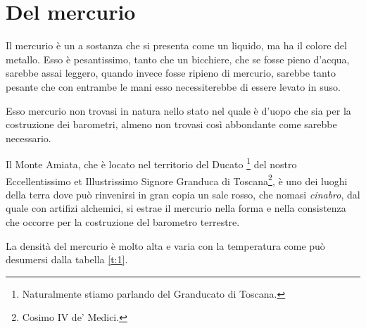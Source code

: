 \documentclass[%
corpo=12pt,
twoside,
tipotesi=magistrale,
]{toptesi}\errorcontextlines=100
\begin{document}
\section{Del mercurio}
Il mercurio è un a sostanza che si presenta come un liquido, ma ha il colore
del metallo. Esso è pesantissimo, tanto che un bicchiere, che se fosse pieno
d'acqua, sarebbe assai leggero, quando invece fosse ripieno di mercurio,
sarebbe tanto pesante che con entrambe le mani esso necessiterebbe di essere
levato in suso.

Esso mercurio non trovasi in natura nello stato nel quale è d'uopo che sia
per la costruzione dei barometri, almeno non trovasi così abbondante come
sarebbe necessario.

\setcounter{footnote}{25}

Il Monte Amiata, che è locato nel territorio del Ducato%
\footnote{Naturalmente stiamo parlando del Granducato di Toscana.}
del nostro Eccellentissimo et Illustrissimo Signore Granduca di Toscana\footnote{Cosimo IV de' Medici.}, è uno dei luoghi della terra dove può rinvenirsi in gran copia un sale rosso, che nomasi \emph{cinabro}, dal quale con artifizi alchemici, si estrae il mercurio nella forma e nella consistenza che occorre per la costruzione del barometro terrestre.

La densità del mercurio è molto alta e varia con la temperatura come
può desumersi dalla tabella \ref{t:1}.
\end{document}
